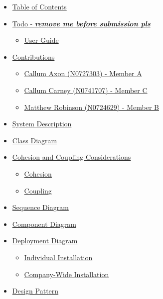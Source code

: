 \documentclass[
  english,
  a4paper,
,tablecaptionabove
]{scrartcl}
\providecommand{\tightlist}{%
  \setlength{\itemsep}{0pt}\setlength{\parskip}{0pt}}
\begin{document}
\begin{itemize}
\tightlist
\item
  \protect\hyperlink{table-of-contents}{Table of Contents}
\item
  \protect\hyperlink{todo---remove-me-before-submission-pls}{Todo -
  \textbf{\emph{remove me before submission pls}}}

  \begin{itemize}
  \tightlist
  \item
    \protect\hyperlink{user-guide}{User Guide}
  \end{itemize}
\item
  \protect\hyperlink{contributions}{Contributions}

  \begin{itemize}
  \tightlist
  \item
    \protect\hyperlink{callum-axon-n0727303---member-a}{Callum Axon
    (N0727303) - Member A}
  \item
    \protect\hyperlink{callum-carney-n0741707---member-c}{Callum Carney
    (N0741707) - Member C}
  \item
    \protect\hyperlink{matthew-robinson-n0724629---member-b}{Matthew
    Robinson (N0724629) - Member B}
  \end{itemize}
\item
  \protect\hyperlink{system-description}{System Description}
\item
  \protect\hyperlink{class-diagram}{Class Diagram}
\item
  \protect\hyperlink{cohesion-and-coupling-considerations}{Cohesion and
  Coupling Considerations}

  \begin{itemize}
  \tightlist
  \item
    \protect\hyperlink{cohesion}{Cohesion}
  \item
    \protect\hyperlink{coupling}{Coupling}
  \end{itemize}
\item
  \protect\hyperlink{sequence-diagram}{Sequence Diagram}
\item
  \protect\hyperlink{component-diagram}{Component Diagram}
\item
  \protect\hyperlink{deployment-diagram}{Deployment Diagram}

  \begin{itemize}
  \tightlist
  \item
    \protect\hyperlink{individual-installation}{Individual Installation}
  \item
    \protect\hyperlink{company-wide-installation}{Company-Wide
    Installation}
  \end{itemize}
\item
  \protect\hyperlink{design-pattern}{Design Pattern}


\end{itemize}
\end{document}
